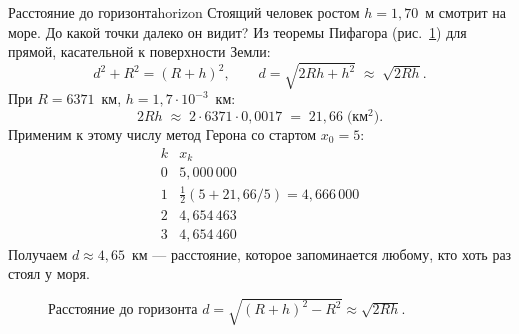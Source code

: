 \begin{example}{Расстояние до горизонта}{horizon}
Стоящий человек ростом $h=1{,}70$~м смотрит на море. До какой точки
далеко он видит? Из теоремы Пифагора (рис.~\ref{fig:horizon}) для прямой,
касательной к поверхности Земли:
\[
d^{2}+R^{2}=(R+h)^{2},\qquad
d=\sqrt{2Rh+h^{2}}\;\approx\;\sqrt{2Rh}.
\]
При $R=6371$~км, $h=1{,}7\cdot 10^{-3}$~км:
\[
2Rh\;\approx\;2\cdot 6371\cdot 0{,}0017\;=\;21{,}66\;\text{(км$^2$)}.
\]
Применим к этому числу метод Герона со стартом $x_0=5$:
\[
\begin{array}{l|l}
k & x_k \\\hline
0 & 5{,}000\,000 \\
1 & \tfrac{1}{2}(5+21{,}66/5)=4{,}666\,000 \\
2 & 4{,}654\,463 \\
3 & 4{,}654\,460
\end{array}
\]
Получаем $d\approx 4{,}65$~км — расстояние, которое запоминается
любому, кто хоть раз стоял у моря.
\end{example}

\begin{figure}[ht]
\centering
{}
\caption{Расстояние до горизонта $d=\sqrt{(R+h)^2-R^2}\approx\sqrt{2Rh}$.}
\label{fig:horizon}
\end{figure}

